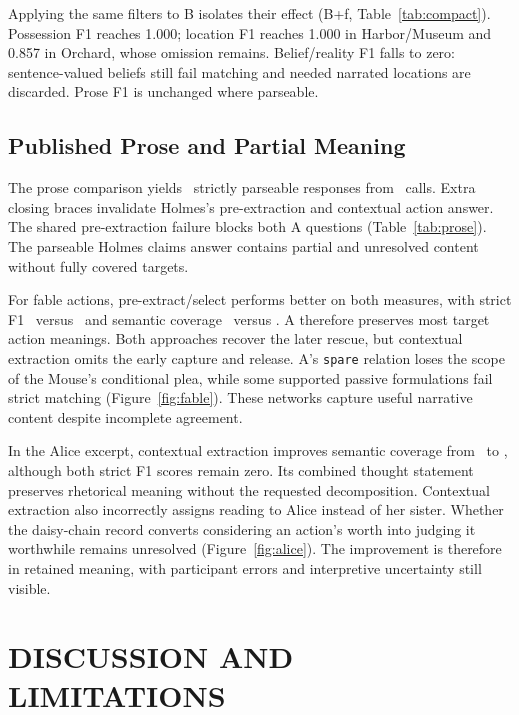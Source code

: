 \documentclass[a4paper,twoside]{article}
\begin{document}
Applying the same filters to B isolates their effect (B+f, Table~\ref{tab:compact}). Possession F1 reaches 1.000; location F1 reaches 1.000 in Harbor/Museum and 0.857 in Orchard, whose omission remains. Belief/reality F1 falls to zero: sentence-valued beliefs still fail matching and needed narrated locations are discarded. Prose F1 is unchanged where parseable.

\subsection{Published Prose and Partial Meaning}
\noindent The prose comparison yields \ProseParsed\ strictly parseable responses from \ProseCalls\ calls. Extra closing braces invalidate Holmes's pre-extraction and contextual action answer. The shared pre-extraction failure blocks both A questions (Table~\ref{tab:prose}). The parseable Holmes claims answer contains partial and unresolved content without fully covered targets.



For fable actions, pre-extract/select performs better on both measures, with strict F1 \FableAFone\ versus \FableBFone\ and semantic coverage \FableACoverage\ versus \FableBCoverage. A therefore preserves most target action meanings. Both approaches recover the later rescue, but contextual extraction omits the early capture and release. A's \texttt{spare} relation loses the scope of the Mouse's conditional plea, while some supported passive formulations fail strict matching (Figure~\ref{fig:fable}). These networks capture useful narrative content despite incomplete agreement.

In the Alice excerpt, contextual extraction improves semantic coverage from \AliceACoverage\ to \AliceBCoverage, although both strict F1 scores remain zero. Its combined thought statement preserves rhetorical meaning without the requested decomposition. Contextual extraction also incorrectly assigns reading to Alice instead of her sister. Whether the daisy-chain record converts considering an action's worth into judging it worthwhile remains unresolved (Figure~\ref{fig:alice}). The improvement is therefore in retained meaning, with participant errors and interpretive uncertainty still visible.









\section{\uppercase{Discussion and Limitations}}
\end{document}
